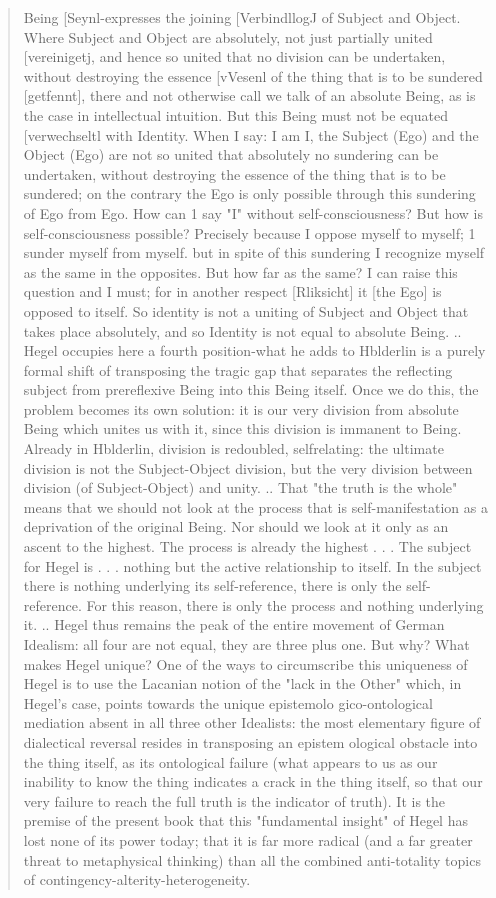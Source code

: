 \documentclass{book}
\begin{document}
\begin{quotation}
Being [Seynl-expresses the joining [VerbindllogJ of Subject and Object. Where Subject and Object are absolutely, not just partially united [vereinigetj, and hence so united that no division can be undertaken, without destroying the essence [vVesenl of the thing that is to be sundered [getfennt], there and not otherwise call we talk of an absolute Being, as is the case in intellectual intuition.
But this Being must not be equated [verwechseltl with Identity. When I say: I am I, the Subject (Ego) and the Object (Ego) are not so united that absolutely no sundering can be undertaken, without destroying the essence of the thing that is to be sundered; on the contrary the Ego is only possible through this sundering of Ego from Ego. How can 1 say "I" without self-consciousness? But how is self-consciousness possible? Precisely because I oppose myself to myself; 1 sunder myself from myself. but in spite of this sundering I recognize myself as the same in the opposites. But how far as the same? I can raise this question and I must; for in another respect [Rliksicht] it [the Ego] is opposed to itself. So identity is not a uniting of Subject and Object that takes place absolutely, and so Identity is not equal to absolute Being.
..
Hegel occupies here a fourth position-what he adds to Hblderlin is a purely formal shift of transposing the tragic gap that separates the reflecting subject from prereflexive Being into this Being itself. Once we do this, the problem becomes its own solution: it is our very division from absolute Being which unites us with it, since this division is immanent to Being. Already in Hblderlin, division is redoubled, selfrelating: the ultimate division is not the Subject-Object division, but the very division between division (of Subject-Object) and unity. 
..
That "the truth is the whole" means that we should not look at the process that is self-manifestation as a deprivation of the original Being. Nor should we look at it only as an ascent to the highest. The process is already the highest . . . The subject for Hegel is . . . nothing but the active relationship to itself. In the subject there is nothing underlying its self-reference, there is only the self-reference. For this reason, there is only the process and nothing underlying it.
..
Hegel thus remains the peak of the entire movement of German Idealism: all four are not equal, they are three plus one. But why? What makes Hegel unique? One of the ways to circumscribe this uniqueness of Hegel is to use the Lacanian notion of the "lack in the Other" which, in Hegel's case, points towards the unique epistemolo gico-ontological mediation absent in all three other Idealists: the most elementary figure of dialectical reversal resides in transposing an epistem ological obstacle into the thing itself, as its ontological failure (what appears to us as our inability to know the thing indicates a crack in the thing itself, so that our very failure to reach the full truth is the indicator of truth). It is the premise of the present book that this "fundamental insight" of Hegel has lost none of its power today; that it is far more radical (and a far greater threat to metaphysical thinking) than all the combined anti-totality topics of contingency-alterity-heterogeneity.
\end{quotation}
\end{document}
